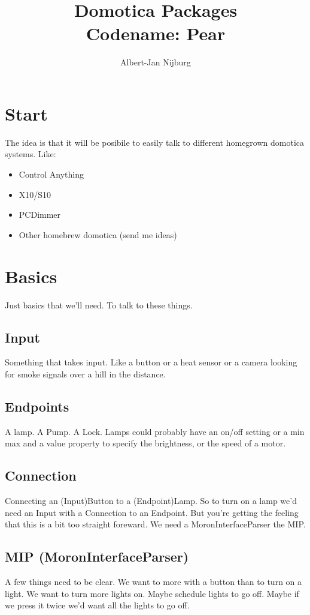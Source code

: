\documentclass[a4paper]{article}
\author{Albert-Jan Nijburg}
\title{Domotica Packages\\Codename: Pear}
\begin{document}
\maketitle
\section{Start}
The idea is that it will be posibile to easily talk to different homegrown domotica systems. Like:
\begin{itemize}
\item Control Anything
\item X10/S10
\item PCDimmer
\item Other homebrew domotica (send me ideas)
\end{itemize}
\section{Basics}
Just basics that we'll need. To talk to these things. 

\subsection{Input}
Something that takes input. Like a button or a heat sensor or a camera looking for smoke signals over a hill in the distance.

\subsection{Endpoints}
A lamp. A Pump. A Lock. Lamps could probably have an on/off setting or a min max and a value property to specify the brightness, or the speed of a motor. 

\subsection{Connection}
Connecting an (Input)Button to a (Endpoint)Lamp. So to turn on a lamp we'd need an Input with a Connection to an Endpoint. But you're getting the feeling that this is a bit too straight foreward. We need a MoronInterfaceParser the MIP. 

\subsection{MIP (MoronInterfaceParser)}
A few things need to be clear. We want to more with a button than to turn on a light. We want to turn more lights on. Maybe schedule lights to go off. Maybe if we press it twice we'd want all the lights to go off. 
\end{document}
